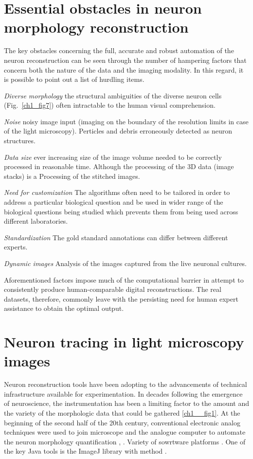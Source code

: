 \section{Essential obstacles in neuron morphology reconstruction}
The key obstacles concerning the full, accurate and robust automation of the neuron reconstruction \cite{meijering2010neuron,donohue2011automated,acciai2016automated} can be seen through the number of hampering factors that concern both the nature of the data and the imaging modality. In this regard, it is possible to point out a list of hurdling items.

\textit{Diverse morphology} the structural ambiguities of the diverse neuron cells (Fig.~\ref{ch1_fig7}) often intractable to the human visual comprehension.

\textit{Noise} noisy image input (imaging on the boundary of the resolution limits in case of the light microscopy). Perticles and debris erroneously detected as neuron structures.

\textit{Data size} ever increasing size of the image volume needed to be correctly processed in reasonable time. Although the processing of the 3D data (image stacks) is a  Processing of the stitched images.

\textit{Need for customization} The algorithms often need to be tailored in order to address a particular biological question and be used in wider range of the biological questions being studied which prevents them from being used across different laboratories.

\textit{Standardization} The gold standard annotations can differ between different experts.

\textit{Dynamic images} Analysis of the images captured from the live neuronal cultures.


Aforementioned factors impose much of the computational barrier \cite{peng2011proof,svoboda2011past} in attempt to consistently produce human-comparable digital reconstructions. The real datasets, therefore, commonly leave with the persisting need for human expert assistance to obtain the optimal output. 

\section{Neuron tracing in light microscopy images}
Neuron reconstruction tools have been adopting to the advancements of technical infrastructure available for experimentation. In decades following the emergence of neuroscience, the instrumentation has been a limiting factor to the amount and the variety of the morphologic data that could be gathered \ref{ch1__fig1}. At the beginning of the second half of the 20th century, conventional electronic analog techniques were used to join microscope and the analogue computer to automate the neuron morphology quantification \cite{glaser1965semi},  \cite{capowski1981accurate}. Variety of sowrtware platforms \cite{meijering2010neuron,acciai2016automated}. One of the key Java tools is the ImageJ library \cite{abramoff2004image} with method \cite{longair2011simple,pool2008neuritetracer}.


